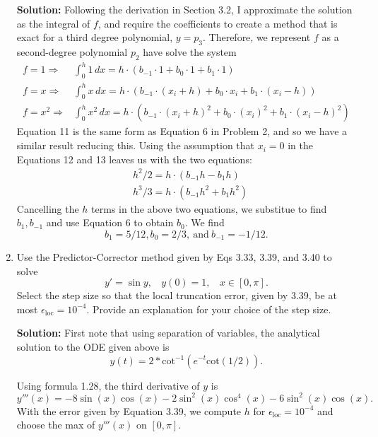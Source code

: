 \documentclass[11pt]{article}
\begin{document}
\begin{enumerate}
\bigskip
\textbf{Solution:} Following the derivation in Section 3.2, I approximate the solution as the integral of $f$, and require the coefficients to create a method that is exact for a third degree polynomial, $y = p_3$.
Therefore, we represent $f$ as a second-degree polynomial $p_2$ have solve the system 
\begin{align} f = 1 \Rightarrow & \int _0 ^h 1\,dx = h \cdot (b_{-1} \cdot 1 + b_{0} \cdot 1 + b_{1} \cdot 1 )\\
f = x \Rightarrow & \int _{0} ^{h} x\,dx = h \cdot (b_{-1} \cdot (x_i+h) + b_{0} \cdot x_i + b_{1} \cdot (x_i - h ))\\
f = x^2 \Rightarrow & \int _{0} ^{h} x^2\,dx = h \cdot (b_{-1} \cdot (x_i+h)^2 + b_{0} \cdot(x_i)^2 + b_{1} \cdot (x_i - h )^2)\end{align}
Equation 11 is the same form as Equation 6 in Problem 2, and so we have a similar result reducing this.
Using the assumption that $x_i = 0$ in the Equations 12 and 13 leaves us with the two equations:
\begin{align} & h^2/2  = h \cdot (b_{-1} h - b_{1} h )\\
& h^3/3 = h \cdot (b_{-1} h^2  + b_{1} h ^2)\end{align}
Cancelling the $h$ terms in the above two equations, we substitue to find $b_1,b_{-1}$ and use Equation 6 to obtain $b_0$.
We find
\begin{equation} b_{1} = 5/12, b_0 = 2/3, ~\text{and}~ b_{-1} = -1/12 .\end{equation}

\item Use the Predictor-Corrector method given by Eqs 3.33, 3.39, and 3.40 to solve
\begin{equation} y' = \sin y, ~~~~ y(0) = 1, ~~~~ x \in [0, \pi ] . \end{equation}
Select the step size so that the local truncation error, given by 3.39, be at most $\epsilon _{\text{loc}} = 10^{-4}$.
Provide an  explanation for your choice of the step size.

\bigskip
\textbf{Solution:} First note that using separation of variables, the analytical solution to the ODE given above is
\begin{equation} y(t) = 2 * \text{cot} ^{-1} \left ( e^{-t} \text{cot} (1/2) \right ).\end{equation}

Using formula 1.28, the third derivative of $y$ is
\begin{equation} y'''(x) = -8\sin(x)\cos(x) -2\sin^2(x)\cos^4(x) -6\sin^2(x)\cos(x) .\end{equation}
With the error given by Equation 3.39, we compute $h$ for $\epsilon _\text{loc} = 10^{-4}$ and choose the max of $y'''(x)$ on $[0,\pi]$.


\end{enumerate}
\end{document}
